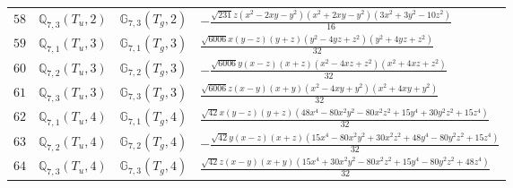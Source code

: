 \documentclass[fleqn,8pt,landscape]{jsarticle}
\begin{document}
\begin{table}[ht!]
\begin{center}
\begin{tabular}{cccl}
$ 58 $ & $ \mathbb{Q}_{7,3}(T_{u},2) $ & $ \mathbb{G}_{7,3}(T_{g},2) $ & $ - \frac{\sqrt{231} z \left(x^{2} - 2 x y - y^{2}\right) \left(x^{2} + 2 x y - y^{2}\right) \left(3 x^{2} + 3 y^{2} - 10 z^{2}\right)}{16} $ \\
$ 59 $ & $ \mathbb{Q}_{7,1}(T_{u},3) $ & $ \mathbb{G}_{7,1}(T_{g},3) $ & $ \frac{\sqrt{6006} x \left(y - z\right) \left(y + z\right) \left(y^{2} - 4 y z + z^{2}\right) \left(y^{2} + 4 y z + z^{2}\right)}{32} $ \\
$ 60 $ & $ \mathbb{Q}_{7,2}(T_{u},3) $ & $ \mathbb{G}_{7,2}(T_{g},3) $ & $ - \frac{\sqrt{6006} y \left(x - z\right) \left(x + z\right) \left(x^{2} - 4 x z + z^{2}\right) \left(x^{2} + 4 x z + z^{2}\right)}{32} $ \\
$ 61 $ & $ \mathbb{Q}_{7,3}(T_{u},3) $ & $ \mathbb{G}_{7,3}(T_{g},3) $ & $ \frac{\sqrt{6006} z \left(x - y\right) \left(x + y\right) \left(x^{2} - 4 x y + y^{2}\right) \left(x^{2} + 4 x y + y^{2}\right)}{32} $ \\
$ 62 $ & $ \mathbb{Q}_{7,1}(T_{u},4) $ & $ \mathbb{G}_{7,1}(T_{g},4) $ & $ \frac{\sqrt{42} x \left(y - z\right) \left(y + z\right) \left(48 x^{4} - 80 x^{2} y^{2} - 80 x^{2} z^{2} + 15 y^{4} + 30 y^{2} z^{2} + 15 z^{4}\right)}{32} $ \\
$ 63 $ & $ \mathbb{Q}_{7,2}(T_{u},4) $ & $ \mathbb{G}_{7,2}(T_{g},4) $ & $ - \frac{\sqrt{42} y \left(x - z\right) \left(x + z\right) \left(15 x^{4} - 80 x^{2} y^{2} + 30 x^{2} z^{2} + 48 y^{4} - 80 y^{2} z^{2} + 15 z^{4}\right)}{32} $ \\
$ 64 $ & $ \mathbb{Q}_{7,3}(T_{u},4) $ & $ \mathbb{G}_{7,3}(T_{g},4) $ & $ \frac{\sqrt{42} z \left(x - y\right) \left(x + y\right) \left(15 x^{4} + 30 x^{2} y^{2} - 80 x^{2} z^{2} + 15 y^{4} - 80 y^{2} z^{2} + 48 z^{4}\right)}{32} $ \\
 \hline \hline
\end{tabular}
\end{center}
\end{table}
\end{document}
